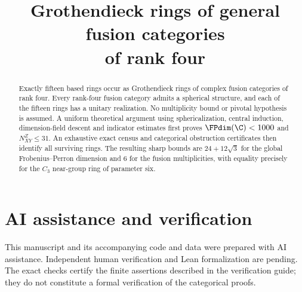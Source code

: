 \documentclass[11pt]{article}
\title{Grothendieck rings of general fusion categories\\of rank four}
\date{}
\numberwithin{equation}{section}
\begin{document}
\raggedbottom
\maketitle
\begin{abstract}
Exactly fifteen based rings occur as Grothendieck rings of complex
fusion categories of rank four. Every rank-four fusion category admits
a spherical structure, and each of the fifteen rings has a unitary
realization. No multiplicity bound or pivotal hypothesis is assumed.
A uniform theoretical argument using sphericalization, central induction,
dimension-field descent and indicator estimates first proves
$\FPdim(\C)<1000$ and $N_{XY}^{Z}\le31$. An exhaustive exact census
and categorical obstruction certificates then identify all surviving
rings. The resulting sharp bounds are $24+12\sqrt3$ for the global
Frobenius--Perron dimension and $6$ for the fusion multiplicities,
with equality precisely for the $C_3$ near-group ring of parameter six.
\end{abstract}
\ResearchNotice
\tableofcontents














\appendix

\section*{AI assistance and verification}
This manuscript and its accompanying code and data were prepared with AI
assistance. Independent human verification and Lean formalization are
pending. The exact checks certify the finite assertions described in the
verification guide; they do not constitute a formal verification of the
categorical proofs.
\begingroup\small

\endgroup
\end{document}
